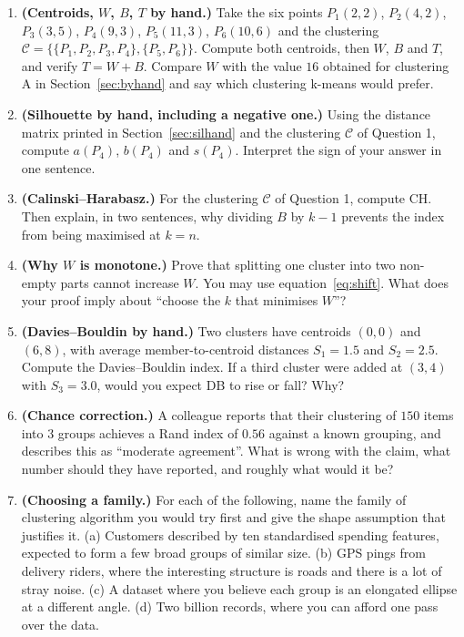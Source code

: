 \documentclass[11pt]{article}
\begin{document}
\begin{enumerate}[leftmargin=*]
  \item \textbf{(Centroids, $W$, $B$, $T$ by hand.)} Take the six points
    $P_1(2,2)$, $P_2(4,2)$, $P_3(3,5)$, $P_4(9,3)$, $P_5(11,3)$, $P_6(10,6)$
    and the clustering $\mathcal{C} = \{\{P_1,P_2,P_3,P_4\},\{P_5,P_6\}\}$.
    Compute both centroids, then $W$, $B$ and $T$, and verify $T = W + B$.
    Compare $W$ with the value $16$ obtained for clustering A in
    Section~\ref{sec:byhand} and say which clustering k-means would prefer.

  \item \textbf{(Silhouette by hand, including a negative one.)} Using the
    distance matrix printed in Section~\ref{sec:silhand} and the clustering
    $\mathcal{C}$ of Question 1, compute $a(P_4)$, $b(P_4)$ and $s(P_4)$.
    Interpret the sign of your answer in one sentence.

  \item \textbf{(Calinski--Harabasz.)} For the clustering $\mathcal{C}$ of
    Question 1, compute $\mathrm{CH}$. Then explain, in two sentences, why
    dividing $B$ by $k-1$ prevents the index from being maximised at $k = n$.

  \item \textbf{(Why $W$ is monotone.)} Prove that splitting one cluster into
    two non-empty parts cannot increase $W$. You may use
    equation~\eqref{eq:shift}. What does your proof imply about ``choose the
    $k$ that minimises $W$''?

  \item \textbf{(Davies--Bouldin by hand.)} Two clusters have centroids
    $(0,0)$ and $(6,8)$, with average member-to-centroid distances
    $S_1 = 1.5$ and $S_2 = 2.5$. Compute the Davies--Bouldin index. If a
    third cluster were added at $(3,4)$ with $S_3 = 3.0$, would you expect DB
    to rise or fall? Why?

  \item \textbf{(Chance correction.)} A colleague reports that their
    clustering of $150$ items into $3$ groups achieves a Rand index of
    $0.56$ against a known grouping, and describes this as ``moderate
    agreement''. What is wrong with the claim, what number should they have
    reported, and roughly what would it be?

  \item \textbf{(Choosing a family.)} For each of the following, name the
    family of clustering algorithm you would try first and give the shape
    assumption that justifies it. (a) Customers described by ten
    standardised spending features, expected to form a few broad groups of
    similar size. (b) GPS pings from delivery riders, where the interesting
    structure is roads and there is a lot of stray noise. (c) A dataset where
    you believe each group is an elongated ellipse at a different angle.
    (d) Two billion records, where you can afford one pass over the data.


\end{enumerate}
\end{document}
